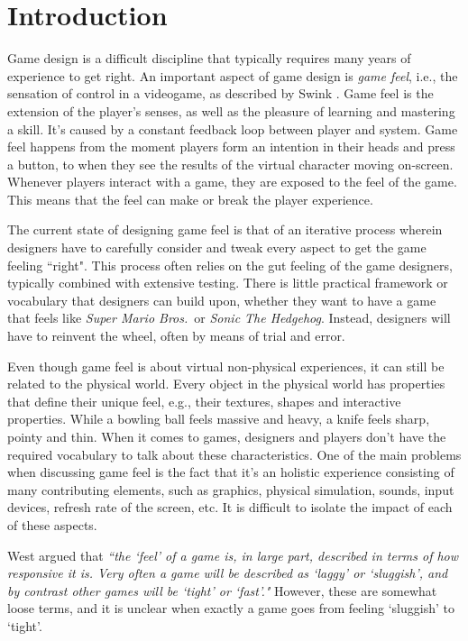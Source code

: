 \section{Introduction}
Game design is a difficult discipline that typically requires many years of experience to get right. An important aspect of game design is \textit{game feel}, i.e., the sensation of control in a videogame, as described by Swink \cite{swink}. Game feel is the extension of the player's senses, as well as the pleasure of learning and mastering a skill. It's caused by a constant feedback loop between player and system. Game feel happens from the moment players form an intention in their heads and press a button, to when they see the results of the virtual character moving on-screen. Whenever players interact with a game, they are exposed to the feel of the game. This means that the feel can make or break the player experience.

The current state of designing game feel is that of an iterative process wherein designers have to carefully consider and tweak every aspect to get the game feeling ``right". This process often relies on the gut feeling of the game designers, typically combined with extensive testing. There is little practical framework or vocabulary that designers can build upon, whether they want to have a game that feels like \textit{Super Mario Bros.}\ or \textit{Sonic The Hedgehog}. Instead, designers will have to reinvent the wheel, often by means of trial and error.

Even though game feel is about virtual non-physical experiences, it can still be related to the physical world. Every object in the physical world has properties that define their unique feel, e.g., their textures, shapes and interactive properties. While a bowling ball feels massive and heavy, a knife feels sharp, pointy and thin. When it comes to games, designers and players don't have the required vocabulary to talk about these characteristics. One of the main problems when discussing game feel is the fact that it's an holistic experience consisting of many contributing elements, such as graphics, physical simulation, sounds, input devices, refresh rate of the screen, etc. It is difficult to isolate the impact of each of these aspects.

West argued that \textit{``the `feel' of a game is, in large part, described in terms of how responsive it is. Very often a game will be described as `laggy' or `sluggish', and by contrast other games will be `tight' or `fast'."} \cite{measure_lag} However, these are somewhat loose terms, and it is unclear when exactly a game goes from feeling `sluggish' to `tight'.

